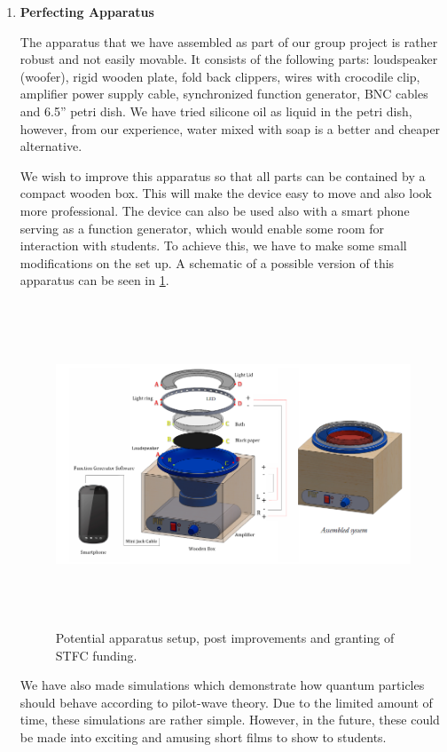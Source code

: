 \begin{enumerate}
\item \textbf{Perfecting Apparatus}

The apparatus that we have assembled as part of our group project is rather robust and not easily movable. It consists of the following parts: loudspeaker (woofer), rigid wooden plate, fold back clippers, wires with crocodile clip, amplifier power supply cable, synchronized function generator, BNC cables and 6.5'' petri dish. We have tried silicone oil as liquid in the petri dish, however, from our experience, water mixed with soap is a better and cheaper alternative.

We wish to improve this apparatus so that all parts can be contained by a compact wooden box. This will make the device easy to move and also look more professional. The device can also be used also with a smart phone serving as a function generator, which would enable some room for interaction with students. To achieve this, we have to make some small modifications on the set up. A schematic of a possible version of this apparatus can be seen in \ref{fig:apparatus_diagram_STFC}.

\begin{figure}
\centering
    \includegraphics[width=16.14cm,height=9.647cm]{education/STFCproposal/Apparatus_STFC.png}
    \caption{Potential apparatus setup, post improvements and granting of STFC funding.}
    \label{fig:apparatus_diagram_STFC}
\end{figure}

We have also made simulations which demonstrate how quantum particles should behave according to pilot-wave theory. Due to the limited amount of time, these simulations are rather simple. However, in the future, these could be made into exciting and amusing short films to show to students.


\end{enumerate}
